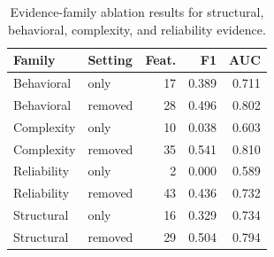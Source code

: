\begin{table}[!htbp]
\centering
\scriptsize
\begin{tabular}{llrrr}
\toprule
Family & Setting & Feat. & F1 & AUC \\
\midrule
Behavioral & only & 17 & 0.389 & 0.711 \\
Behavioral & removed & 28 & 0.496 & 0.802 \\
Complexity & only & 10 & 0.038 & 0.603 \\
Complexity & removed & 35 & 0.541 & 0.810 \\
Reliability & only & 2 & 0.000 & 0.589 \\
Reliability & removed & 43 & 0.436 & 0.732 \\
Structural & only & 16 & 0.329 & 0.734 \\
Structural & removed & 29 & 0.504 & 0.794 \\
\bottomrule
\end{tabular}
\vspace{0.5em}
\caption{Evidence-family ablation results for structural, behavioral, complexity, and reliability evidence.}
\label{tab:family-ablation}
\end{table}
